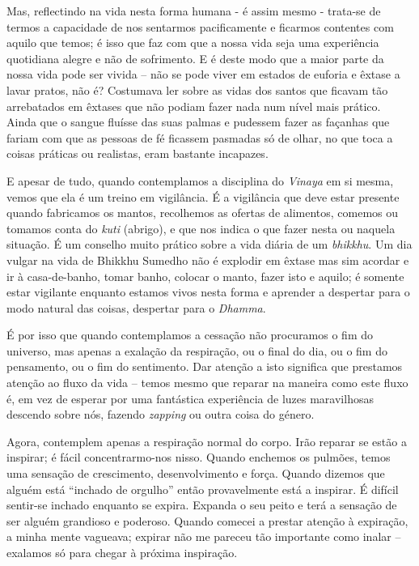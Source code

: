 Mas, reflectindo na vida nesta forma humana - é assim mesmo - trata-se
de termos a capacidade de nos sentarmos pacificamente e ficarmos
contentes com aquilo que temos; é isso que faz com que a nossa vida seja
uma experiência quotidiana alegre e não de sofrimento. E é deste modo
que a maior parte da nossa vida pode ser vivida -- não se pode viver em
estados de euforia e êxtase a lavar pratos, não é? Costumava ler sobre
as vidas dos santos que ficavam tão arrebatados em êxtases que não
podiam fazer nada num nível mais prático. Ainda que o sangue fluísse das
suas palmas e pudessem fazer as façanhas que fariam com que as pessoas
de fé ficassem pasmadas só de olhar, no que toca a coisas práticas ou
realistas, eram bastante incapazes.

E apesar de tudo, quando contemplamos a disciplina do \emph{Vinaya} em
si mesma, vemos que ela é um treino em vigilância. É a vigilância que
deve estar presente quando fabricamos os mantos, recolhemos as ofertas
de alimentos, comemos ou tomamos conta do \emph{kuti} (abrigo), e que
nos indica o que fazer nesta ou naquela situação. É um conselho muito
prático sobre a vida diária de um \emph{bhikkhu}. Um dia vulgar na vida
de Bhikkhu Sumedho não é explodir em êxtase mas sim acordar e ir à
casa-de-banho, tomar banho, colocar o manto, fazer isto e aquilo; é
somente estar vigilante enquanto estamos vivos nesta forma e aprender a
despertar para o modo natural das coisas, despertar para o
\emph{Dhamma}.

É por isso que quando contemplamos a cessação não procuramos o fim do
universo, mas apenas a exalação da respiração, ou o final do dia, ou o
fim do pensamento, ou o fim do sentimento. Dar atenção a isto significa
que prestamos atenção ao fluxo da vida -- temos mesmo que reparar na
maneira como este fluxo é, em vez de esperar por uma fantástica
experiência de luzes maravilhosas descendo sobre nós, fazendo
\emph{zapping} ou outra coisa do género.

Agora, contemplem apenas a respiração normal do corpo. Irão reparar se
estão a inspirar; é fácil concentrarmo-nos nisso. Quando enchemos os
pulmões, temos uma sensação de crescimento,  desenvolvimento e força.
Quando dizemos que alguém está ``inchado de orgulho'' então
provavelmente está a inspirar. É difícil sentir-se inchado enquanto se
expira. Expanda o seu peito e terá a sensação de ser alguém grandioso e
poderoso. Quando comecei a prestar atenção à expiração, a minha mente
vagueava; expirar não me pareceu tão importante como inalar -- exalamos
só para chegar à próxima inspiração.

